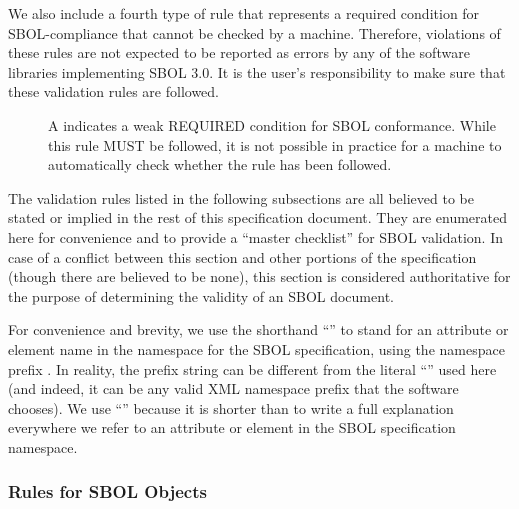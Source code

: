 We also include a fourth type of rule that represents a required condition for SBOL-compliance that cannot be checked by a machine. Therefore, violations of these rules are not expected to be reported as errors by any of the software libraries implementing SBOL 3.0. It is the user's responsibility to make sure that these validation rules are followed.

\begin{description}
\item[\hspace*{6.5pt}\cSymbol\csp] A \cSymbolName indicates a weak REQUIRED condition for SBOL conformance. While this rule MUST be followed, it is not possible in practice for a machine to automatically check whether the rule has been followed.
\end{description}


The validation rules listed in the following subsections are all believed to be
stated or implied in the rest of this specification document.  They
are enumerated here for convenience and to provide a ``master
checklist'' for SBOL validation.  In case of a conflict between this
section and other portions of the specification (though there are believed to
be none), this section is considered authoritative for the purpose of
determining the validity of an SBOL document.

For \notice convenience and brevity, we use the shorthand
``'' to stand for an attribute or element name 
in the namespace for the SBOL specification, using
the namespace prefix .  In reality, the prefix string can be different from the literal ``'' used here (and indeed, it can be any valid XML namespace prefix that the software
chooses).  We use ``'' because it is shorter than to
write a full explanation everywhere we refer to an attribute or element
in the SBOL specification namespace.

\subsubsection*{Rules for SBOL Objects}
\setcounter{sbolCtr}{10101} 



